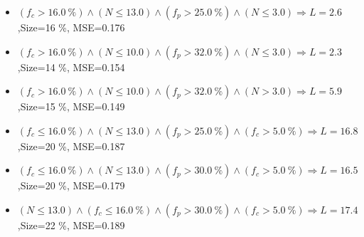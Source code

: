 \documentclass[numbered]{CSL}
\begin{document}
\begin{itemize}
\item $(f_c > 16.0~\%) \land (N \leq 13.0) \land (f_p > 25.0~\%) \land (N \leq 3.0) \Rightarrow L = 2.6$,\hfill Size=16 \%, MSE=0.176
\item $(f_c > 16.0~\%) \land (N \leq 10.0) \land (f_p > 32.0~\%) \land (N \leq 3.0) \Rightarrow L = 2.3$,\hfill Size=14 \%, MSE=0.154
\item $(f_c > 16.0~\%) \land (N \leq 10.0) \land (f_p > 32.0~\%) \land (N > 3.0) \Rightarrow L = 5.9$,\hfill Size=15 \%, MSE=0.149
\item $(f_c \leq 16.0~\%) \land (N \leq 13.0) \land (f_p > 25.0~\%) \land (f_c > 5.0~\%) \Rightarrow L = 16.8$,\hfill Size=20 \%, MSE=0.187
\item $(f_c \leq 16.0~\%) \land (N \leq 13.0) \land (f_p > 30.0~\%) \land (f_c > 5.0~\%) \Rightarrow L = 16.5$,\hfill Size=20 \%, MSE=0.179
\item $(N \leq 13.0) \land (f_c \leq 16.0~\%) \land (f_p > 30.0~\%) \land (f_c > 5.0~\%) \Rightarrow L = 17.4$,\hfill Size=22 \%, MSE=0.189
\end{itemize}
\end{document}
